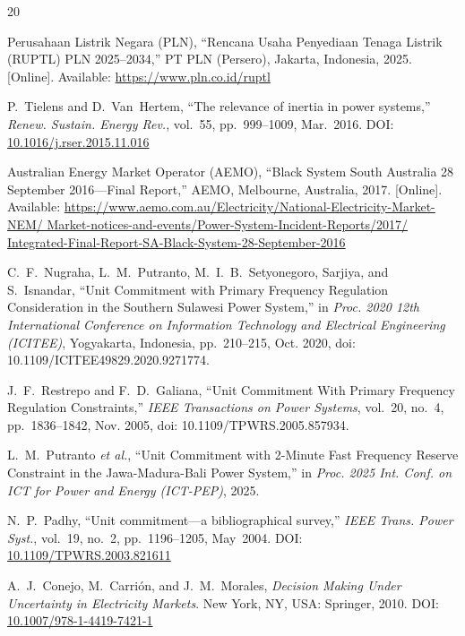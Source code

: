 \documentclass[journal]{IEEEtran}
\begin{document}

\begin{thebibliography}{20}

Perusahaan Listrik Negara (PLN),
``Rencana Usaha Penyediaan Tenaga Listrik (RUPTL) PLN
2025--2034,'' PT PLN (Persero), Jakarta, Indonesia, 2025.
[Online]. Available: \url{https://www.pln.co.id/ruptl}

P.~Tielens and D.~Van~Hertem,
``The relevance of inertia in power systems,''
\textit{Renew. Sustain. Energy Rev.},
vol.~55, pp.~999--1009, Mar.~2016.
DOI: \href{https://doi.org/10.1016/j.rser.2015.11.016}
{10.1016/j.rser.2015.11.016}

Australian Energy Market Operator (AEMO),
``Black System South Australia 28 September 2016---Final Report,''
AEMO, Melbourne, Australia, 2017.
[Online]. Available:
\url{https://www.aemo.com.au/Electricity/National-Electricity-Market-NEM/
Market-notices-and-events/Power-System-Incident-Reports/2017/
Integrated-Final-Report-SA-Black-System-28-September-2016}

C.~F.~Nugraha, L.~M.~Putranto, M.~I.~B.~Setyonegoro, Sarjiya, and S.~Isnandar,
``Unit Commitment with Primary Frequency Regulation Consideration
in the Southern Sulawesi Power System,''
in \textit{Proc. 2020 12th International Conference on Information
Technology and Electrical Engineering (ICITEE)}, Yogyakarta, Indonesia,
pp.~210--215, Oct. 2020, doi: 10.1109/ICITEE49829.2020.9271774.

J.~F.~Restrepo and F.~D.~Galiana,
``Unit Commitment With Primary Frequency Regulation Constraints,''
\textit{IEEE Transactions on Power Systems}, vol.~20, no.~4,
pp.~1836--1842, Nov. 2005, doi: 10.1109/TPWRS.2005.857934.

L.~M.~Putranto \textit{et al.},
``Unit Commitment with 2-Minute Fast Frequency Reserve Constraint
in the Jawa-Madura-Bali Power System,''
in \textit{Proc. 2025 Int. Conf. on ICT for Power and Energy
(ICT-PEP)}, 2025.

N.~P.~Padhy,
``Unit commitment---a bibliographical survey,''
\textit{IEEE Trans. Power Syst.},
vol.~19, no.~2, pp.~1196--1205, May~2004.
DOI: \href{https://doi.org/10.1109/TPWRS.2003.821611}
{10.1109/TPWRS.2003.821611}

A.~J.~Conejo, M.~Carri\'on, and J.~M.~Morales,
\textit{Decision Making Under Uncertainty in Electricity Markets}.
New York, NY, USA: Springer, 2010.
DOI: \href{https://doi.org/10.1007/978-1-4419-7421-1}
{10.1007/978-1-4419-7421-1}


\end{thebibliography}
\end{document}
